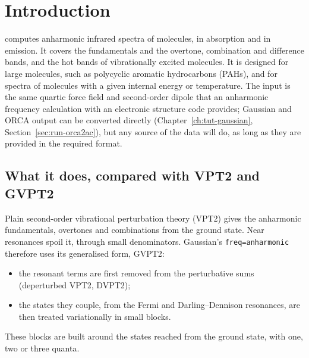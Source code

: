 \chapter{Introduction}\label{ch:intro}

\ac{} computes anharmonic infrared spectra of molecules, in absorption and
in emission. It covers the fundamentals and the overtone, combination and
difference bands, and the hot bands of vibrationally excited molecules. It
is designed for large molecules, such as polycyclic aromatic hydrocarbons
(PAHs), and for spectra of molecules with a given internal energy or
temperature. The input is the same quartic force field and second-order
dipole that an anharmonic frequency calculation with an electronic
structure code provides; Gaussian and ORCA output can be converted directly
(Chapter~\ref{ch:tut-gaussian}, Section~\ref{sec:run-orca2ac}), but any source of the data will do, as long as they are provided in the required format.

\section{What it does, compared with VPT2 and GVPT2}

Plain second-order vibrational perturbation theory (VPT2) gives the
anharmonic fundamentals, overtones and combinations from the ground state.
Near resonances spoil it, through small denominators. Gaussian's
\texttt{freq=anharmonic} therefore uses its generalised form, GVPT2:
\begin{itemize}
\item the resonant terms are first removed from the perturbative sums
  (deperturbed VPT2, DVPT2);
\item the states they couple, from the Fermi and Darling--Dennison
  resonances, are then treated variationally in small blocks.
\end{itemize}

These blocks are built around the states reached from the ground state,
with one, two or three quanta.

